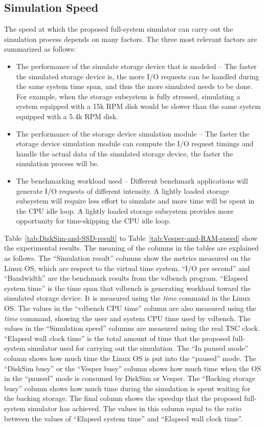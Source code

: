 \subsection{Simulation Speed}
\label{sec:simulation-performance}

The speed at which the proposed full-system simulator can carry out the simulation process depends on many factors. The three most relevant factors are summarized as follows:

\begin{itemize}
	\item The performance of the simulate storage device that is modeled – The faster the simulated storage device is, the more I/O requests can be handled during the same system time span, and thus the more simulated needs to be done. For example, when the storage subsystem is fully stressed, simulating a system equipped with a 15k RPM disk would be slower than the same system equipped with a 5.4k RPM disk.
	
	\item The performance of the storage device simulation module – The faster the storage device simulation module can compute the I/O request timings and handle the actual data of the simulated storage device, the faster the simulation process will be.
	
	\item The benchmarking workload used – Different benchmark applications will generate I/O requests of different intensity. A lightly loaded storage subsystem will require less effort to simulate and more time will be spent in the CPU idle loop. A lightly loaded storage subsystem provides more opportunity for time-skipping the CPU idle loop.
\end{itemize}

Table~\ref{tab:DiskSim-and-SSD-result} to Table~\ref{tab:Vesper-and-RAM-speed} show the experimental results. The meaning of the columns in the tables are explained as follows. The ``Simulation result'' columns show the metrics measured on the Linux OS, which are respect to the virtual time system. ``I/O per second'' and ``Bandwidth'' are the benchmark results from the vdbench program. ``Elapsed system time'' is the time span that vdbench is generating workload toward the simulated storage device. It is measured using the \textit{time} command in the Linux OS. The values in the ``vdbench CPU time'' column are also measured using the \textit{time} command, showing the user and system CPU time used by vdbench. The values in the ``Simulation speed'' columns are measured using the real TSC clock. ``Elapsed wall clock time'' is the total amount of time that the proposed full-system simulator used for carrying out the simulation. The ``In paused mode'' column shows how much time the Linux OS is put into the ``paused'' mode. The ``DiskSim busy'' or the ``Vesper busy'' column shows how much time when the OS in the ``paused'' mode is consumed by DiskSim or Vesper. The ``Backing storage busy'' column shows how much time during the simulation is spent waiting for the backing storage. The final column shows the speedup that the proposed full-system simulator has achieved. The values in this column equal to the ratio between the values of ``Elapsed system time'' and ``Elapsed wall clock time''.

